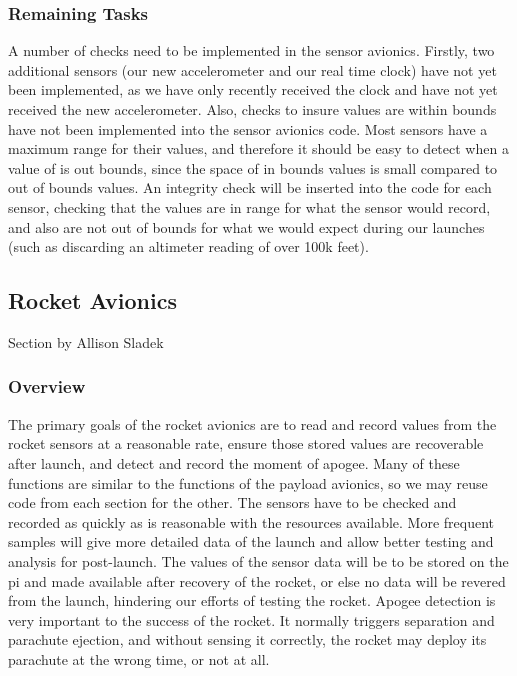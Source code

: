 \documentclass[onecolumn, draftclsnofoot, 10pt, compsoc]{IEEEtran}
\begin{document}
\subsubsection{Remaining Tasks}
A number of checks need to be implemented in the sensor avionics. Firstly, two additional sensors (our new accelerometer and our real time clock) have not yet been implemented, as we have only recently received the clock and have not yet received the new accelerometer. Also, checks to insure values are within bounds have not been implemented into the sensor avionics code. Most sensors have a maximum range for their values, and therefore it should be easy to detect when a value of is out bounds, since the space of in bounds values is small compared to out of bounds values. An integrity check will be inserted into the code for each sensor, checking that the values are in range for what the sensor would record, and also are not out of bounds for what we would expect during our launches (such as discarding an altimeter reading of over 100k feet). 
\subsection{Rocket Avionics}
Section by Allison Sladek
\subsubsection{Overview}
The primary goals of the rocket avionics are to read and record values from the rocket sensors at a reasonable rate, ensure those stored values are recoverable after launch, and detect and record the moment of apogee. 
Many of these functions are similar to the functions of the payload avionics, so we may reuse code from each section for the other. 
The sensors have to be checked and recorded as quickly as is reasonable with the resources available.
More frequent samples will give more detailed data of the launch and allow better testing and analysis for post-launch. 
The values of the sensor data will be to be stored on the pi and made available after recovery of the rocket, or else no data will be revered from the launch, hindering our efforts of testing the rocket.
Apogee detection is very important to the success of the rocket. It normally triggers separation and parachute ejection, and without sensing it correctly, the rocket may deploy its parachute at the wrong time, or not at all. 
\end{document}

